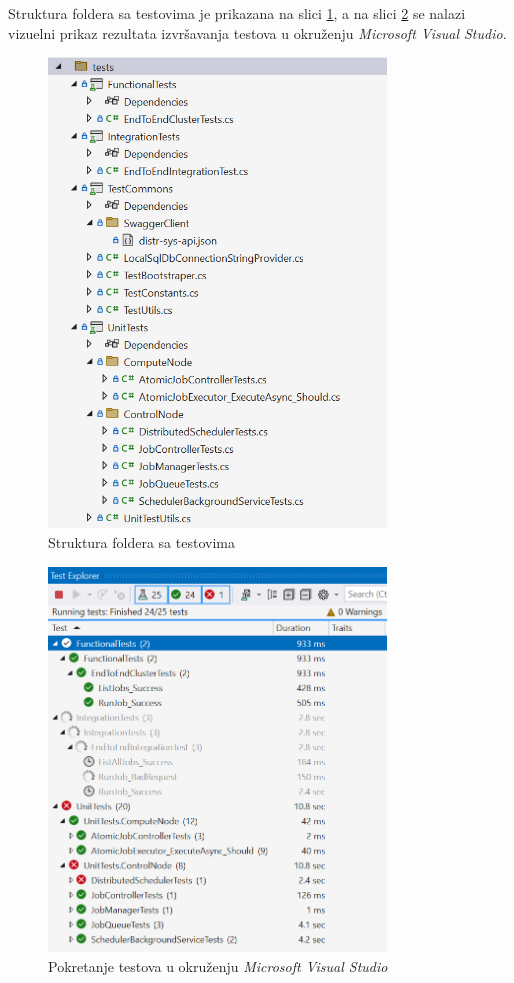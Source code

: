 \documentclass[12pt,oneside]{memoir}
\begin{document}
Struktura foldera sa testovima je prikazana na slici \ref{fig:testovi}, a na slici \ref{fig:testexplorer} se nalazi vizuelni prikaz rezultata izvršavanja testova u okruženju \emph{Microsoft Visual Studio}.

\begin{figure}[!ht]
  \centering
  \includegraphics[width=0.8\textwidth]{./images/testovi.png}
  \caption{Struktura foldera sa testovima}
  \label{fig:testovi}
\end{figure}

\begin{figure}[!ht]
  \centering
  \includegraphics[width=0.8\textwidth]{./images/testexplorer.png}
  \caption{Pokretanje testova u okruženju \emph{Microsoft Visual Studio}}
  \label{fig:testexplorer}
\end{figure}
\end{document}
